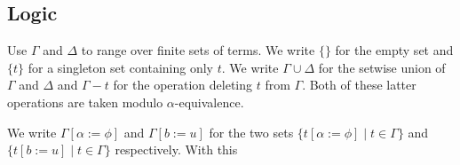 \documentclass{llncs}
\begin{document}
\subsection{Logic}
\label{subsect.logic}


Use $\Gamma$ and $\Delta$ to range over finite sets of terms.
We write $\{ \}$ for the empty set and $\{ t \}$ for a singleton set containing only $t$.
We write $\Gamma \cup \Delta$ for the setwise union of $\Gamma$ and $\Delta$ and $\Gamma - t$ for the operation deleting $t$ from $\Gamma$.
Both of these latter operations are taken modulo $\alpha$-equivalence.

We write $\Gamma[\alpha := \phi]$ and $\Gamma[b := u]$ for the two sets $\{ t[\alpha := \phi] \mid t \in \Gamma \}$ and $\{ t[b := u] \mid t \in \Gamma \}$ respectively.
With this
\end{document}
